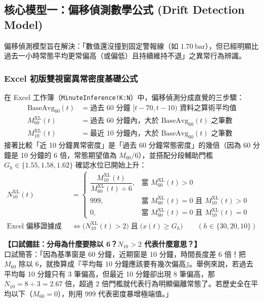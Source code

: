 \documentclass[fontset=none, a4paper, 12pt]{ctexart}
\begin{document}
\begin{doublespace}
\subsection{核心模型一：偏移偵測數學公式 (Drift Detection Model)}
\label{sec:drift_detection}
偏移偵測模型旨在解決：「數值還沒撞到固定警報線（如 $1.70\ \mathrm{bar}$），但已經明顯比過去一小時常態平均更常偏高（或偏低）且持續維持不退」之異常行為辨識。

\subsubsection{Excel 初版雙視窗異常密度基礎公式}
在 Excel 工作簿（\texttt{MinuteInference!K:N}）中，偏移偵測分成直覺的三步驟：
\begin{align}
\mathrm{BaseAvg}_{60}(t) &= \text{過去 60 分鐘 } [t-70, t-10) \text{ 資料之算術平均值} \nonumber \\
M_{60}^{\mathrm{XL}}(t) &= \text{過去 60 分鐘內，大於 } \mathrm{BaseAvg}_{60}(t) \text{ 之筆數} \nonumber \\
M_{10}^{\mathrm{XL}}(t) &= \text{最近 10 分鐘內，大於 } \mathrm{BaseAvg}_{60}(t) \text{ 之筆數}
\label{eq:excel_drift_counts}
\end{align}
接著比較「近 10 分鐘異常密度」是「過去 60 分鐘常態密度」的幾倍（因為 60 分鐘是 10 分鐘的 6 倍，常態期望值為 $M_{60}/6$），並搭配分段輔助門檻 $G_h \in \{1.55, 1.58, 1.62\}$ 確認水位已開始上升：
\begin{align}
N_{10}^{\mathrm{XL}}(t) &= \begin{cases}
\dfrac{M_{10}^{\mathrm{XL}}(t)}{M_{60}^{\mathrm{XL}}(t) \div 6}, & \text{當 } M_{60}^{\mathrm{XL}}(t) > 0 \\[8pt]
999, & \text{當 } M_{60}^{\mathrm{XL}}(t)=0 \text{ 且 } M_{10}^{\mathrm{XL}}(t)>0 \\
0, & \text{當 } M_{60}^{\mathrm{XL}}(t)=0 \text{ 且 } M_{10}^{\mathrm{XL}}(t)=0
\end{cases} \nonumber \\
\text{Excel 偏移證據成立} &\iff \bigl(N_{10}^{\mathrm{XL}}(t) > 2\bigr) \;\text{且}\; \bigl(x(t) \ge G_h\bigr) \qquad (h\in\{30,20,10\})
\label{eq:excel_n10}
\end{align}

\noindent\textbf{【口試備註：分母為什麼要除以 6？$N_{10} > 2$ 代表什麼意思？】}\\
口試簡答：「因為基準窗是 60 分鐘，近期窗是 10 分鐘，時間長度差 6 倍！把 $M_{60}$ 除以 6，就換算成『平均每 10 分鐘應該要有幾次偏高』。舉例來說，若過去平均每 10 分鐘只有 3 筆偏高，但最近 10 分鐘卻出現 8 筆偏高，那 $N_{10} = 8 \div 3 = 2.67$ 倍，超過 2 倍門檻就代表行為明顯偏離常態了。若歷史全在平均以下（$M_{60}=0$），則用 999 代表密度暴增極端值。」


\end{doublespace}
\end{document}
